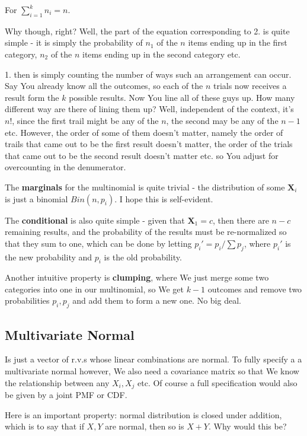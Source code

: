 \documentclass{article}
\begin{document}
		For $\sum^k_{i=1} n_i = n$. 
		
		Why though, right? Well, the part of the equation corresponding to 2. is quite simple - it is simply the probability of $n_1$ of the $n$ items ending up in the first category, $n_2$ of the $n$ items ending up in the second category etc.
		
		1. then is simply counting the number of ways such an arrangement can occur. Say You already know all the outcomes, so each of the $n$ trials now receives a result form the $k$ possible results. Now You line all of these guys up. How many different way are there of lining them up? Well, independent of the context, it's $n!$, since the first trail might be any of the $n$, the second may be any of the $n-1$ etc. However, the order of some of them doesn't matter, namely the order of trails that came out to be the first result doesn't matter, the order of the trials that came out to be the second result doesn't matter etc. so You adjust for overcounting in the denumerator.
		
		The \textbf{marginals} for the multinomial is quite trivial - the distribution of some $\bm{X}_i$ is just a binomial $Bin(n, p_i)$. I hope this is self-evident.
		
		The \textbf{conditional} is also quite simple - given that $\bm{X}_1 = c$, then there are $n-c$ remaining results, and the probability of the results must be re-normalized so that they sum to one, which can be done by letting $p_i' = p_i/\sum p_j$, where $p_i'$ is the new probability and $p_i$ is the old probability.
		
		Another intuitive property is \textbf{clumping}, where We just merge some two categories into one in our multinomial, so We get $k-1$ outcomes and remove two probabilities $p_i, p_j$ and add them to form a new one. No big deal.
		
	\subsection{Multivariate Normal}
	
		Is just a vector of r.v.s whose linear combinations are normal. To fully specify a a multivariate normal however, We also need a covariance matrix so that We know the relationship between any $X_i, X_j$ etc. Of course a full specification would also be given by a joint PMF or CDF.
		
		Here is an important property: normal distribution is closed under addition, which is to say that if $X, Y$ are normal, then so is $X+Y$. Why would this be?
		
\end{document}
